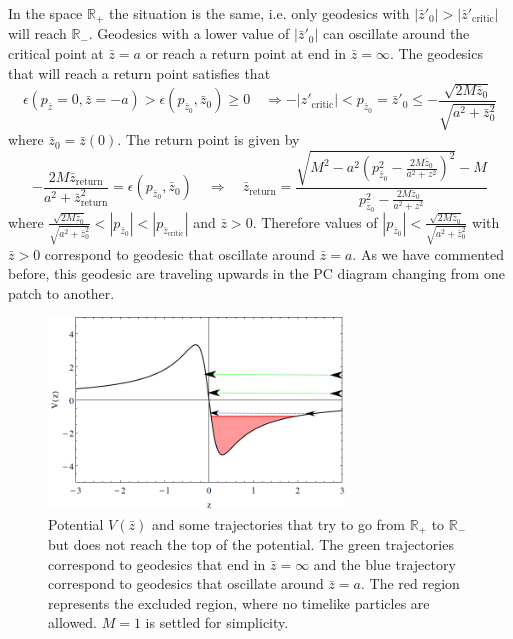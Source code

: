 In the space $\mathbb{R_+}$ the situation is the same, i.e. only geodesics with $|\bar{z}'_0|>|\bar{z}'_\text{critic}|$ will reach $\mathbb{R_-}$. Geodesics with a lower value of $|\bar{z}'_0|$ can oscillate around the critical point at $\bar{z}=a$ or reach a return point at end in $\bar z=\infty$. The geodesics that will reach a return point satisfies that
\begin{equation}
 \epsilon(p_{\bar{z}}=0,\bar{z}=-a)>\epsilon(p_{\bar{z}_0},\bar{z}_0)\geq 0 \quad \Longrightarrow  -|z'_\text{critic}|< p_{\bar{z}_0} =\bar{z}'_0 \leq - \frac{\sqrt{2 M \bar{z}_0} }{\sqrt{a^2+\bar{z}_0^2}}
\end{equation}
where $\bar{z}_0=\bar{z}(0)$. The return point is given by
\begin{equation}
 -\frac{2 M \bar{z}_\text{return}}{a^2+\bar{z}_\text{return}^2}=\epsilon(p_{\bar{z}_0},\bar{z}_0) \quad \Longrightarrow \quad \bar{z}_\text{return}=\frac{\sqrt{M^2-a^2 \left(p_{\bar{z}_0}^2-\frac{2 M \bar{z}_0}{a^2+z^2}\right)^2}-M}{p_{\bar{z}_0}^2-\frac{2 M \bar{z}_0}{a^2+z^2}}
\end{equation}
where $\frac{\sqrt{2 M \bar{z}_0} }{\sqrt{a^2+\bar{z}_0^2}}<|p_{\bar{z}_0}|<|p_{\bar{z}_\text{critic}}|$ and $\bar z>0$. Therefore values of $|p_{\bar{z}_0}|<\frac{\sqrt{2 M \bar{z}_0} }{\sqrt{a^2+\bar{z}_0^2}}$ with $\bar z>0$ correspond to geodesic that oscillate around $\bar z=a$. As we have commented before, this geodesic are traveling upwards in the \gls{PC} diagram changing from one patch to another.
 \begin{figure}[hpt!] 
\begin{center}
 \centerline{\includegraphics[width=0.7\textwidth]{img/Chapter3/Return2.png}}
 \end{center}
 \caption{Potential $V(\bar z)$ and some trajectories that try to go from $\mathbb{R_+}$ to $\mathbb{R_-}$ but does not reach the top of the potential. The green trajectories correspond to geodesics that end in $\bar z=\infty$ and the blue trajectory correspond to geodesics that oscillate around $\bar z=a$. The red region represents the excluded region, where no timelike particles are allowed. $M=1$ is settled for simplicity.}
 \label{fig:return2}
\end{figure} 
